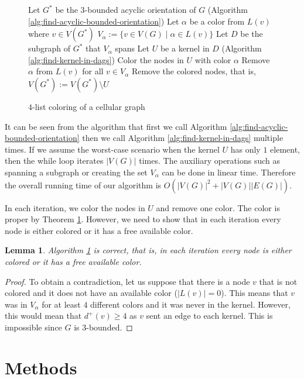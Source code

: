 \documentclass[letterpaper, 10 pt, conference]{ieeeconf}  %
\makeatletter
\newtheorem{lem}{Lemma}
\newcommand{\removelatexerror}{\let\@latex@error\@gobble}
\makeatother
\begin{document}
\begin{figure}[H]
\removelatexerror
\begin{algorithm}[H]\label{alg:four-list-coloring}
  Let $G^*$ be the $3$-bounded acyclic orientation of $G$ (Algorithm \ref{alg:find-acyclic-bounded-orientation})\;
   {
  	Let $\alpha$ be a color from $L(v)$ where $v \in V(G^*)$\;
  	$V_\alpha := \lbrace v \in V(G) \mid \alpha \in L(v) \rbrace$\;
  	Let $D$ be the subgraph of $G^*$ that $V_\alpha$ spans\;
  	Let $U$ be a kernel in $D$ (Algorithm \ref{alg:find-kernel-in-dags})\;
  	Color the nodes in $U$ with color $\alpha$\;
  	Remove $\alpha$ from $L(v)$ for all $v \in V_\alpha$\;
  	Remove the colored nodes, that is, $V(G^*) := V(G^*) \setminus U$\;
  }
 \caption{$4$-list coloring of a cellular graph}
\end{algorithm}
\end{figure}
It can be seen from the algorithm that first we call Algorithm \ref{alg:find-acyclic-bounded-orientation} then we call Algorithm \ref{alg:find-kernel-in-dags} multiple times. If we assume the worst-case scenario when the kernel $U$ has only $1$ element, then the while loop iterates $|V(G)|$ times. The auxiliary operations such as spanning a subgraph or creating the set $V_\alpha$ can be done in linear time. Therefore the overall running time of our algorithm is $O(|V(G)|^2+|V(G)||E(G)|)$.

In each iteration, we color the nodes in $U$ and remove one color. The color is proper by Theorem \ref{alg:four-list-coloring}. However, we need to show that in each iteration every node is either colored or it has a free available color.
\begin{lem} Algorithm \ref{alg:four-list-coloring} is correct, that is, in each iteration every node is either colored or it has a free available color.
\end{lem}
\begin{proof} To obtain a contradiction, let us suppose that there is a node $v$ that is not colored and it does not have an available color ($|L(v)|=0$). This means that $v$ was in $V_{\alpha}$ for at least $4$ different colors and it was never in the kernel. However, this would mean that $d^+(v) \geqslant 4$ as $v$ sent an edge to each kernel. This is impossible since $G$ is $3$-bounded.
\end{proof}
\section{Methods}\label{sec:method}
\end{document}
